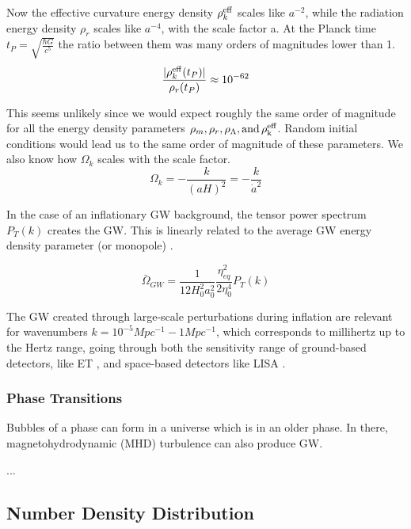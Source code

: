 Now the effective curvature energy density $\rho_{k}^{\rm{eff}}$ scales like $a^{-2}$, while the radiation energy density $\rho_{r}$ scales like $a^{-4}$, with the scale factor a.
At the Planck time $t_P = \sqrt{\frac{\hbar G}{c^5}}$ the ratio between them was many orders of magnitudes lower than 1.
\begin{equation}
    \frac{|\rho_k^{\rm{eff}}(t_P)|}{\rho_r(t_P)} \approx 10^{-62}
\end{equation}

This seems unlikely since we would expect roughly the same order of magnitude for all the energy density parameters $\rho_m, \rho_r, \rho_\Lambda, \rm{ and } \, \rho_k^{eff}$. Random initial conditions would lead us to the same order of magnitude of these parameters.
We also know how $\Omega_k$ scales with the scale factor.
\begin{equation}
    \Omega_k = - \frac{k}{(aH)^2}= -\frac{k}{\dot{a}^2}
\end{equation}

In the case of an inflationary GW background, the tensor power spectrum $P_T(k)$ creates the GW. This is linearly related to the average GW energy density parameter (or monopole) \cite{schulze_gw_class_2023}.

\begin{equation}
    \bar{\Omega}_{GW} = \frac{1}{12 H_0^2 a_0^2} \frac{\eta_{eq}^2}{2\eta_0^4} P_T(k)
\end{equation}

The GW created through large-scale perturbations during inflation are relevant for wavenumbers $k=10^{-5} Mpc^{-1} -1 Mpc^{-1}$, which corresponds to millihertz up to the Hertz range, going through both the sensitivity range of ground-based detectors, like ET \cite{alonso_noise_2020}, and space-based detectors like LISA \cite{robson_construction_2019}.

\subsubsection{Phase Transitions}

Bubbles of a phase can form in a universe which is in an older phase. In there, magnetohydrodynamic (MHD) turbulence can also produce GW.

...

\subsection{Number Density Distribution}

